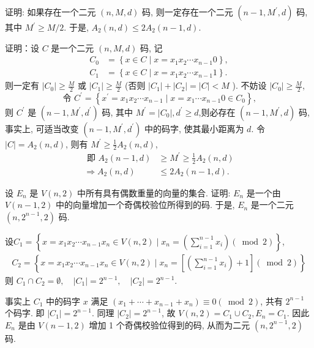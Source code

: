 \begin{exercise}
证明: 如果存在一个二元 $ (n, M, d) $ 码, 则一定存在一个二元 $ \left(n-1, M^{\prime}, d\right) $ 码, 其中 $ M^{\prime} \geq M / 2 $. 于是, $ A_{2}(n, d) \leq 2 A_{2}(n-1, d) $.
\end{exercise}
\begin{solution}
    证明：设 $ C $ 是一个二元 $ (n, M, d) $ 码, 记
$$
\begin{aligned}
C_{0} & =\left\{x \in C \mid x=x_{1} x_{2} \cdots x_{n-1} 0\right\}, \\
C_{1} & =\left\{x \in C \mid x=x_{1} x_{2} \cdots x_{n-1} 1\right\} .
\end{aligned}
$$
则一定有 $ \left|C_{0}\right| \geq \frac{M}{2} $ 或 $ \left|C_{1}\right| \geq \frac{M}{2} $ (否则 $ \left|C_{1}\right|+\left|C_{2}\right|=|C|<M $ ).
不妨设 $ \left|C_{0}\right| \geq \frac{M}{2} $,
$$
\text { 令 } C^{\prime}=\left\{x^{\prime}=x_{1} x_{2} \cdots x_{n-1} \mid x=x_{1} \cdots x_{n-1} 0 \in C_{0}\right\} \text {, }
$$
则 $ C^{\prime} $ 是 $ \left(n-1, M^{\prime}, d^{\prime}\right) $ 码, 其中 $ M^{\prime}=\left|C_{0}\right|, d^{\prime} \geq d $,则必存在 $ \left(n-1, M^{\prime}, d\right) $ 码, 事实上, 可适当改变 $ \left(n-1, M^{\prime}, d^{\prime}\right) $ 中的码字, 使其最小距离为 $ d $.
令 $ |C|=A_{2}(n, d) $, 则有 $ M^{\prime} \geq \frac{1}{2} A_{2}(n, d) $,
$$
\begin{aligned}
\text { 即 } A_{2}(n-1, d) & \geq M^{\prime} \geq \frac{1}{2} A_{2}(n, d) \\
\Rightarrow A_{2}(n, d) & \leq 2 A_{2}(n-1, d) .
\end{aligned}
$$
\end{solution}



\begin{exercise}
 设 $ E_{n} $ 是 $ V(n, 2) $ 中所有具有偶数重量的向量的集合. 证明: $ E_{n} $ 是一个由 $ V(n-1,2) $ 中的向量增加一个奇偶校验位所得到的码. 于是, $ E_{n} $ 是一个二元 $ \left(n, 2^{n-1}, 2\right) $ 码.
\end{exercise}
\begin{solution}
设$C_{1}=\left\{x=x_{1} x_{2} \cdots x_{n-1} x_{n} \in V(n, 2) \mid x_{n}=\left(\sum\limits_{i=1}^{n-1} x_{i}\right)(\bmod 2)\right\}$,
$$
\begin{array}{l}
C_{2}=\left\{x=x_{1} x_{2} \cdots x_{n-1} x_{n} \in V(n, 2) \mid x_{n}=\left[\left(\sum\limits_{i=1}^{n-1} x_{i}\right)+1\right](\bmod 2)\right\} 
\end{array}
$$
 则 $C_{1} \cap C_{2}=\emptyset,\quad \left|C_{1}\right|=2^{n-1}, \quad\left|C_{2}\right|=2^{n-1}$.

事实上 $ C_{1} $ 中的码字 $ x $ 满足 $ \left(x_{1}+\cdots+x_{n-1}+x_{n}\right) \equiv 0(\bmod 2) $, 共有 $ 2^{n-1} $ 个码字. 即 $ \left|C_{1}\right|=2^{n-1} $.
同理 $ \left|C_{2}\right|=2^{n-1} $, 故 $ V(n, 2)=C_{1} \cup C_{2}, E_{n}=C_{1} $. 因此 $ E_{n} $ 是由 $ V(n-1,2) $ 增加 1 个奇偶校验位得到的码, 从而为二元 $ \left(n, 2^{n-1}, 2\right) $ 码.
\end{solution}


